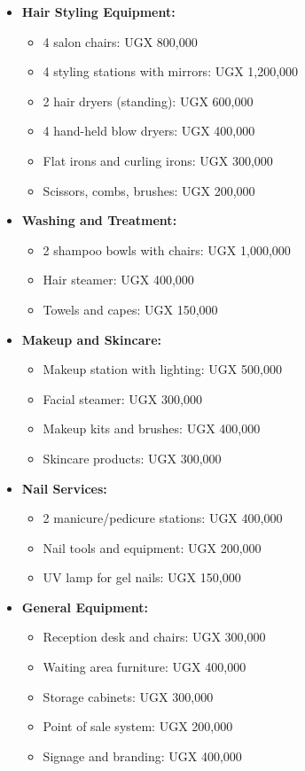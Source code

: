 \documentclass[a4paper,12pt]{article}
\begin{document}
\begin{itemize}[leftmargin=2em]
    \item \textbf{Hair Styling Equipment:}
    \begin{itemize}
        \item 4 salon chairs: UGX 800,000
        \item 4 styling stations with mirrors: UGX 1,200,000
        \item 2 hair dryers (standing): UGX 600,000
        \item 4 hand-held blow dryers: UGX 400,000
        \item Flat irons and curling irons: UGX 300,000
        \item Scissors, combs, brushes: UGX 200,000
    \end{itemize}
    
    \item \textbf{Washing and Treatment:}
    \begin{itemize}
        \item 2 shampoo bowls with chairs: UGX 1,000,000
        \item Hair steamer: UGX 400,000
        \item Towels and capes: UGX 150,000
    \end{itemize}
    
    \item \textbf{Makeup and Skincare:}
    \begin{itemize}
        \item Makeup station with lighting: UGX 500,000
        \item Facial steamer: UGX 300,000
        \item Makeup kits and brushes: UGX 400,000
        \item Skincare products: UGX 300,000
    \end{itemize}
    
    \item \textbf{Nail Services:}
    \begin{itemize}
        \item 2 manicure/pedicure stations: UGX 400,000
        \item Nail tools and equipment: UGX 200,000
        \item UV lamp for gel nails: UGX 150,000
    \end{itemize}
    
    \item \textbf{General Equipment:}
    \begin{itemize}
        \item Reception desk and chairs: UGX 300,000
        \item Waiting area furniture: UGX 400,000
        \item Storage cabinets: UGX 300,000
        \item Point of sale system: UGX 200,000
        \item Signage and branding: UGX 400,000
    \end{itemize}
\end{itemize}
\end{document}
